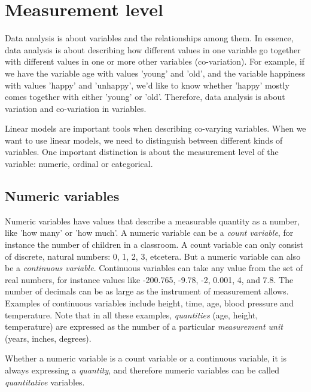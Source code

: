 \section{Measurement level}


Data analysis is about variables and the relationships among them. In essence, data analysis is about describing how different values in one variable go together with different values in one or more other variables (co-variation). For example, if we have the variable age with values 'young' and 'old', and the variable happiness with values 'happy' and 'unhappy', we'd like to know whether 'happy' mostly comes together with either 'young' or 'old'. Therefore, data analysis is about variation and co-variation in variables.

Linear models are important tools when describing co-varying variables. When we want to use linear models, we need to distinguish between different kinds of variables. One important distinction is about the measurement level of the variable: numeric, ordinal or categorical.


\subsection{Numeric variables}

Numeric variables have values that describe a measurable quantity as a number, like 'how many' or 'how much'. A numeric variable can be a \textit{count variable}, for instance the number of children in a classroom. A count variable can only consist of discrete, natural numbers: 0, 1, 2, 3, etcetera. But a numeric variable can also be a \textit{continuous variable}. Continuous variables can take any value from the set of real numbers, for instance values like -200.765, -9.78, -2, 0.001, 4, and 7.8. The number of decimals can be as large as the instrument of measurement allows. Examples of continuous variables include height, time, age, blood pressure and temperature. Note that in all these examples, \textit{quantities} (age, height, temperature) are expressed as the number of a particular \textit{measurement unit} (years, inches, degrees).

Whether a numeric variable is a count variable or a continuous variable, it is always expressing a \textit{quantity}, and therefore numeric variables can be called \textit{quantitative} variables.




